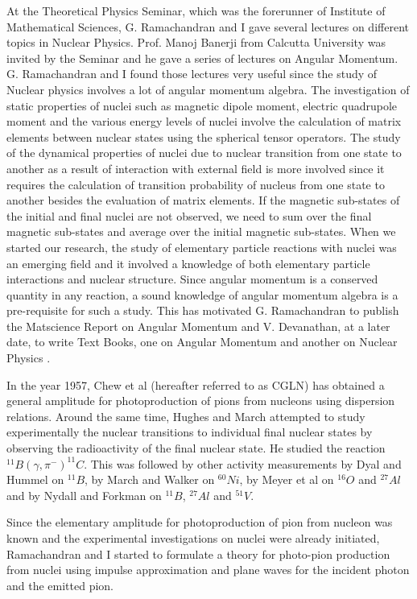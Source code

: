 At the Theoretical Physics Seminar, which was the forerunner of Institute of Mathematical Sciences, G. Ramachandran and I gave several lectures on different topics in Nuclear Physics. Prof. Manoj Banerji from Calcutta University was invited by the Seminar and he gave a series of lectures on Angular Momentum. G. Ramachandran and I found those lectures very useful since the study of Nuclear physics involves a lot of angular momentum algebra. The investigation of static properties of nuclei such as magnetic dipole moment, electric quadrupole moment and the various energy levels of nuclei involve the calculation of matrix elements between nuclear states using the spherical tensor operators. The study of the dynamical properties of nuclei due to nuclear transition from one state to another as a result of interaction with external field is more involved since it requires the calculation of transition probability of nucleus from one state to another besides the evaluation of matrix elements. If the magnetic sub-states of the initial and final nuclei are not observed, we need to sum over the final magnetic sub-states and average over the initial magnetic sub-states. When we started our research, the study of elementary particle reactions with nuclei was an emerging field and it involved a knowledge of both elementary particle interactions and nuclear structure. Since angular momentum is a conserved quantity in any reaction, a sound knowledge of angular momentum algebra is a pre-requisite for such a study. This has motivated G. Ramachandran to publish the Matscience Report on Angular Momentum \cite{key10} and V. Devanathan, at a later date, to write Text Books, one on Angular Momentum \cite{key11} and another on Nuclear Physics \cite{key12}.

In the year 1957, Chew et al (hereafter referred to as CGLN) \cite{key13} has obtained a general amplitude for photoproduction of pions from nucleons using dispersion relations. Around the same time, Hughes and March \cite{key14} attempted to study experimentally the nuclear transitions to individual final nuclear states by observing the radioactivity of the final nuclear state. He studied the reaction ${}^{11} B(\gamma, \pi^-)^{11} C$. This was followed by other activity measurements by Dyal and Hummel \cite{key15} on ${}^{11} B$, by March and Walker \cite{key16} on ${}^{60} N i$, by Meyer et al \cite{key17} on ${}^{16} O$ and ${}^{27} Al$ and by Nydall and Forkman \cite{key18} on ${}^{11} B$, ${}^{27} Al$ and ${}^{51} V$.

Since the elementary amplitude for photoproduction of pion from nucleon was known and the experimental investigations on nuclei were already initiated, Ramachandran and I \cite{key4, key5} started to formulate a theory for photo-pion production from nuclei using impulse approximation and plane waves for the incident photon and the emitted pion.

